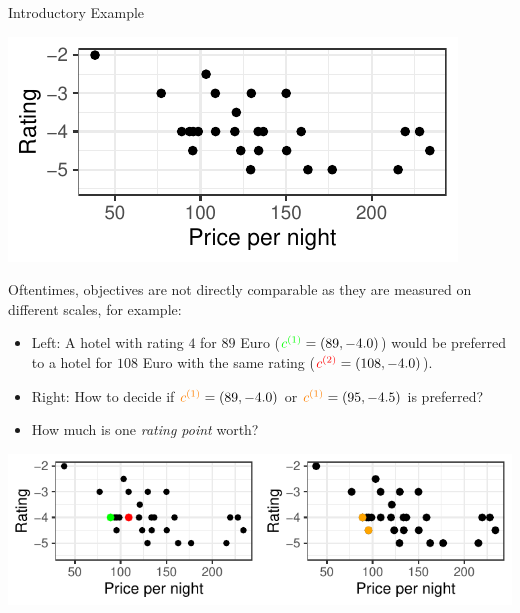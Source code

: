 \begin{frame}[allowframebreaks]{Introductory Example}
\vspace*{0.2cm}

\begin{center}
\includegraphics[scale=1]{images/expedia-1-1}
\end{center}

\framebreak

Oftentimes, objectives are not directly comparable as they are measured on different scales, for example:

\begin{itemize}
    \item Left: A hotel with rating $4$ for $89$ Euro ($\textcolor{green}{c^{(1)}} = \left(89, - 4.0\right)$) would be preferred to a hotel for $108$ Euro with the same rating ($\textcolor{red}{c^{(2)}} = \left(108, - 4.0\right)$).
\item Right: How to decide if $\textcolor{orange}{c^{(1)}} = \left(89, - 4.0\right)$ or $\textcolor{orange}{c^{(1)}} = \left(95, - 4.5\right)$ is preferred?
\item How much is one \textit{rating point} worth?
\end{itemize}

\centering \includegraphics[scale=1]{images/expedia-2-1}

\end{frame}


